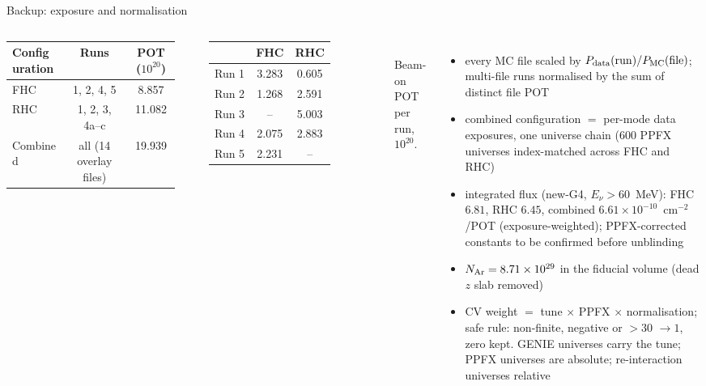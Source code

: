 \documentclass[aspectratio=169,10pt]{beamer}
\begin{document}
\begin{frame}{Backup: exposure and normalisation}
  \begin{columns}[T]
  \footnotesize\setlength{\tabcolsep}{4pt}
  \begin{tabular}{lcc}
  \toprule
  Configuration & Runs & POT ($10^{20}$) \\
  \midrule
  FHC & 1, 2, 4, 5 & 8.857 \\
  RHC & 1, 2, 3, 4a--c & 11.082 \\
  Combined & all (14 overlay files) & 19.939 \\
  \bottomrule
  \end{tabular}\\[6pt]
  \begin{tabular}{lcc}
  \toprule
  & FHC & RHC \\
  \midrule
  Run 1 & 3.283 & 0.605 \\
  Run 2 & 1.268 & 2.591 \\
  Run 3 & --    & 5.003 \\
  Run 4 & 2.075 & 2.883 \\
  Run 5 & 2.231 & --    \\
  \bottomrule
  \end{tabular}\\
  {\footnotesize Beam-on POT per run, $10^{20}$.}
  \footnotesize
  \begin{itemize}\itemsep2pt
    \item every MC file scaled by $P_{\rm data}(\mathrm{run})/P_{\rm MC}(\mathrm{file})$; multi-file runs normalised by the sum of distinct file POT
    \item combined configuration $=$ per-mode data exposures, one universe chain (600 PPFX universes index-matched across FHC and RHC)
    \item integrated flux (new-G4, $E_\nu>60$~MeV): FHC $6.81$, RHC $6.45$, combined $6.61\times10^{-10}$~cm$^{-2}$/POT (exposure-weighted); PPFX-corrected constants to be confirmed before unblinding
    \item $N_{\rm Ar}=8.71\times10^{29}$ in the fiducial volume (dead $z$ slab removed)
    \item CV weight $=$ tune $\times$ PPFX $\times$ normalisation; safe rule: non-finite, negative or $>30$ $\to1$, zero kept. GENIE universes carry the tune; PPFX universes are absolute; re-interaction universes relative
  \end{itemize}
  \end{columns}
\end{frame}
\end{document}
